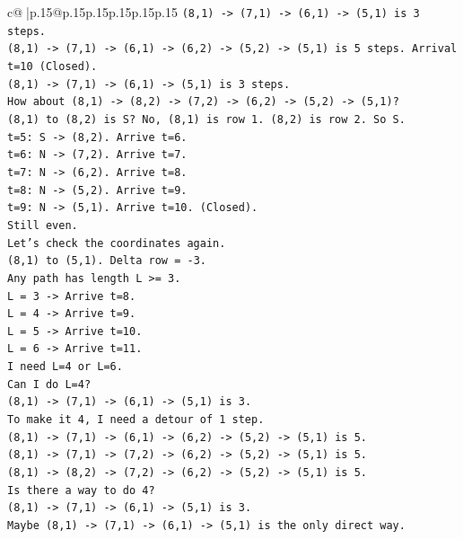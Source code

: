 \documentclass{article}
\begin{document}
{\begin{supertabular}{c@{$\;$}|p{.15\linewidth}@{}p{.15\linewidth}p{.15\linewidth}p{.15\linewidth}p{.15\linewidth}p{.15\linewidth}}
{{{\texttt{(8,1) {-}> (7,1) {-}> (6,1) {-}> (5,1) is 3 steps.} \\
\texttt{(8,1) {-}> (7,1) {-}> (6,1) {-}> (6,2) {-}> (5,2) {-}> (5,1) is 5 steps. Arrival t=10 (Closed).} \\
\texttt{(8,1) {-}> (7,1) {-}> (6,1) {-}> (5,1) is 3 steps.} \\
\texttt{How about (8,1) {-}> (8,2) {-}> (7,2) {-}> (6,2) {-}> (5,2) {-}> (5,1)?} \\
\texttt{(8,1) to (8,2) is S? No, (8,1) is row 1. (8,2) is row 2. So S.} \\
\texttt{t=5: S {-}> (8,2). Arrive t=6.} \\
\texttt{t=6: N {-}> (7,2). Arrive t=7.} \\
\texttt{t=7: N {-}> (6,2). Arrive t=8.} \\
\texttt{t=8: N {-}> (5,2). Arrive t=9.} \\
\texttt{t=9: N {-}> (5,1). Arrive t=10. (Closed).} \\
\texttt{Still even.} \\
\texttt{Let's check the coordinates again.} \\
\texttt{(8,1) to (5,1). Delta row = {-}3.} \\
\texttt{Any path has length L >= 3.} \\
\texttt{L = 3 {-}> Arrive t=8.} \\
\texttt{L = 4 {-}> Arrive t=9.} \\
\texttt{L = 5 {-}> Arrive t=10.} \\
\texttt{L = 6 {-}> Arrive t=11.} \\
\texttt{I need L=4 or L=6.} \\
\texttt{Can I do L=4?} \\
\texttt{(8,1) {-}> (7,1) {-}> (6,1) {-}> (5,1) is 3.} \\
\texttt{To make it 4, I need a detour of 1 step.} \\
\texttt{(8,1) {-}> (7,1) {-}> (6,1) {-}> (6,2) {-}> (5,2) {-}> (5,1) is 5.} \\
\texttt{(8,1) {-}> (7,1) {-}> (7,2) {-}> (6,2) {-}> (5,2) {-}> (5,1) is 5.} \\
\texttt{(8,1) {-}> (8,2) {-}> (7,2) {-}> (6,2) {-}> (5,2) {-}> (5,1) is 5.} \\
\texttt{Is there a way to do 4?} \\
\texttt{(8,1) {-}> (7,1) {-}> (6,1) {-}> (5,1) is 3.} \\
\texttt{Maybe (8,1) {-}> (7,1) {-}> (6,1) {-}> (5,1) is the only direct way.} \\
}}}
\end{supertabular}}
\end{document}
